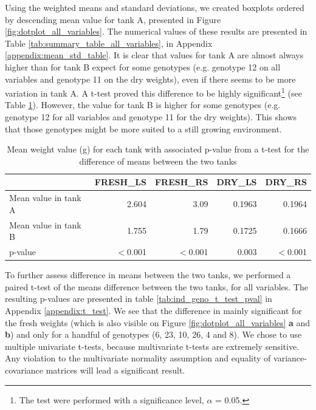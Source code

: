 \begin{table}[hbtp]
\begin{minipage}{0.45\textwidth}
 \end{minipage}
\label{tab:updated_germ_rates}
\end{table}

Using the weighted means and standard deviations, we created boxplots ordered by descending mean value for tank A, presented in Figure \ref{fig:dotplot_all_variables}. The numerical values of these results are presented in Table \ref{tab:summary_table_all_variables}, in Appendix \ref{appendix:mean_std_table}.
It is clear that values for tank A are almost always higher than for tank B expect for some genotypes (e.g. genotype 12 on all variables and genotype 11 on the dry weights), even if there seems to be more variation in tank A. A t-test proved this difference to be highly significant\footnote{The test were performed with a significance level, $\alpha$ = 0.05.} (see Table \ref{tab:mean_diff_between_tanks_t_test}). However, the value for tank B is higher for some genotypes (e.g. genotype 12 for all variables and genotype 11 for the dry weights). This shows that those genotypes might be more suited to a still growing environment.\\


\begin{table}[hbtp]
\centering
\caption[Mean difference between the 2 tanks]{Mean weight value (g) for each tank with associated p-value from a t-test for the difference of means between the two tanks}
\begin{tabular}{lrrrr}
  \toprule
 & FRESH\_LS & FRESH\_RS & DRY\_LS & DRY\_RS \\ 
  \midrule
Mean value in tank A  & 2.604 & 3.09 & 0.1963 & 0.1964 \\ 
Mean value in tank B & 1.755 & 1.79 & 0.1725 & 0.1666 \\ 
  p-value & $<$0.001 & $<$0.001 & 0.003 & $<$0.001 \\ 
   \bottomrule
\end{tabular}
\label{tab:mean_diff_between_tanks_t_test}
\end{table}

To further assess difference in means between the two tanks, we performed a paired t-test of the means difference between the two tanks, for all variables. The resulting p-values are presented in table \ref{tab:ind_geno_t_test_pval} in Appendix \ref{appendix:t_test}. We see that the difference in mainly significant for the fresh weights (which is also visible on Figure \ref{fig:dotplot_all_variables} \textbf{a} and \textbf{b}) and only for a handful of genotypes (6, 23, 10, 26, 4 and 8). We chose to use multiple univariate t-tests, because multivariate t-tests are extremely sensitive. Any violation to the multivariate normality assumption and equality of variance-covariance matrices will lead a significant result. \\

